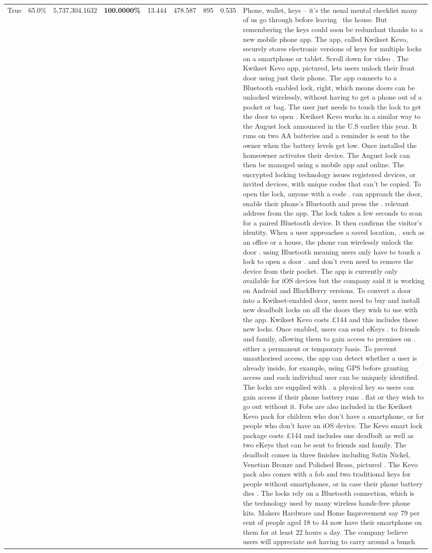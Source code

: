 \begin{table}[H]
\begin{tabular}{lllrlllll}
True & 65.0\% & 5,737,304.1632 & \bfseries \color{red} 100.0000\% & 13.444 & 478.587 & 895 & 0.535 & Phone, wallet, keys – it’s the usual mental checklist many of us go through before leaving  the house. But remembering the keys could soon be redundant thanks to a new mobile phone app. The app, called Kwikset Kevo, securely stores electronic versions of keys for multiple locks on a smartphone or tablet. Scroll down for video . The Kwikset Kevo app, pictured, lets users unlock their front door using just their phone. The app connects to a Bluetooth enabled lock, right, which means doors can be unlocked wirelessly, without having to get a phone out of a pocket or bag. The user just needs to touch the lock to get the door to open . Kwikset Kevo works in a similar way to the August lock announced in the U.S earlier this year. It runs on two AA batteries and a reminder is sent to the owner when the battery levels get low. Once installed the homeowner activates their device. The August lock can then be managed using a mobile app and online. The encrypted locking technology issues registered devices, or invited devices, with unique codes that can't be copied. To open the lock, anyone with a code . can approach the door, enable their phone's Bluetooth and press the . relevant address from the app. The lock takes a few seconds to scan for a paired Bluetooth device. It then confirms the visitor's identity. When a user approaches a saved location, . such as an office or a house, the phone can wirelessly unlock the door . using Bluetooth meaning users only have to touch a lock to open a door . and don't even need to remove the device from their pocket. The app is currently only available for iOS devices but the company said it is working on Android and BlackBerry versions. To convert a door into a Kwikset-enabled door, users need to buy and install new deadbolt locks on all the doors they wish to use with the app. Kwikset Kevo costs £144 and this includes these new locks. Once enabled, users can send eKeys . to friends and family, allowing them to gain access to premises on . either a permanent or temporary basis. To prevent unauthorised access, the app can detect whether a user is already inside, for example, using GPS before granting access and each individual user can be uniquely identified. The locks are supplied with . a physical key so users can gain access if their phone battery runs . flat or they wish to go out without it. Fobs are also included in the Kwikset Kevo pack for children who don't have a smartphone, or for people who don't have an iOS device. The Kevo smart lock package costs £144 and includes one deadbolt as well as two eKeys that can be sent to friends and family. The deadbolt comes in three finishes including Satin Nickel, Venetian Bronze and Polished Brass, pictured . The Kevo pack also comes with a fob and two traditional keys for people without smartphones, or in case their phone battery dies . The locks rely on a Bluetooth connection, which is the technology used by many wireless hands-free phone kits. Makers Hardware and Home Improvement say 79 per cent of people aged 18 to 44 now have their smartphone on them for at least 22 hours a day. The company believe users will appreciate not having to carry around a bunch 
\end{tabular}
\end{table}
